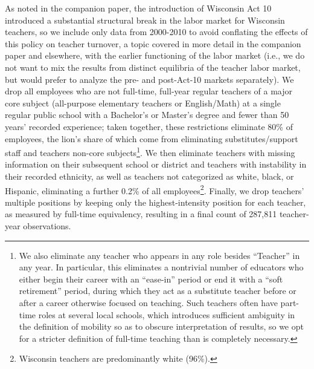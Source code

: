 \documentclass[12pt,]{article}
\let\rmarkdownfootnote\footnote%
\def\footnote{\protect\rmarkdownfootnote}
\begin{document}
As noted in the companion paper, the introduction of Wisconsin Act 10
introduced a substantial structural break in the labor market for
Wisconsin teachers, so we include only data from 2000-2010 to avoid
conflating the effects of this policy on teacher turnover, a topic
covered in more detail in the companion paper and elsewhere, with the
earlier functioning of the labor market (i.e., we do not want to mix the
results from distinct equilibria of the teacher labor market, but would
prefer to analyze the pre- and post-Act-10 markets separately). We drop
all employees who are not full-time, full-year regular teachers of a
major core subject (all-purpose elementary teachers or English/Math) at
a single regular public school with a Bachelor's or Master's degree and
fewer than 50 years' recorded experience; taken together, these
restrictions eliminate 80\% of employees, the lion's share of which come
from eliminating substitutes/support staff and teachers non-core
subjects\footnote{We also eliminate any teacher who appears in any role
  besides ``Teacher'' in any year. In particular, this eliminates a
  nontrivial number of educators who either begin their career with an
  ``ease-in'' period or end it with a ``soft retirement'' period, during
  which they act as a substitute teacher before or after a career
  otherwise focused on teaching. Such teachers often have part-time
  roles at several local schools, which introduces sufficient ambiguity
  in the definition of mobility so as to obscure interpretation of
  results, so we opt for a stricter definition of full-time teaching
  than is completely necessary.}. We then eliminate teachers with
missing information on their subsequent school or district and teachers
with instability in their recorded ethnicity, as well as teachers not
categorized as white, black, or Hispanic, eliminating a further 0.2\% of
all employees\footnote{Wisconsin teachers are predominantly white
  (96\%).}. Finally, we drop teachers' multiple positions by keeping
only the highest-intensity position for each teacher, as measured by
full-time equivalency, resulting in a final count of 287,811
teacher-year observations.
\end{document}
